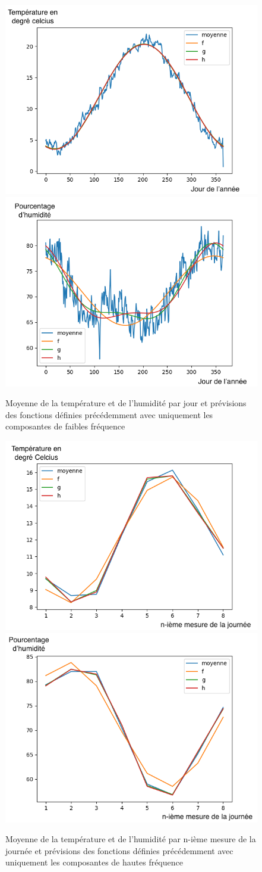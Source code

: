 \documentclass[11pt,a4paper]{article}
\begin{document}
\begin{figure} [!h]
\centering
\includegraphics[width=0.48 \textwidth]{./imagesTIPE/CourbeAnneeT.png}\quad
\includegraphics[width=0.48 \textwidth]{./imagesTIPE/CourbeAnneeH.png}
\caption{\label{fig:190101Lolita} Moyenne de la température et de l'humidité par jour et prévisions des fonctions définies précédemment avec uniquement les composantes de faibles fréquence}
\end{figure}
\begin{figure} [!h]
\centering
\includegraphics[width=0.48 \textwidth]{./imagesTIPE/CourbeJourneeT.png}\quad
\includegraphics[width=0.48 \textwidth]{./imagesTIPE/CourbeJourneeH.png}
\caption{\label{fig:190101Lolita} Moyenne de la température et de l'humidité par n-ième mesure de la journée et prévisions des fonctions définies précédemment avec uniquement les composantes de hautes fréquence }
\end{figure}
\end{document}
